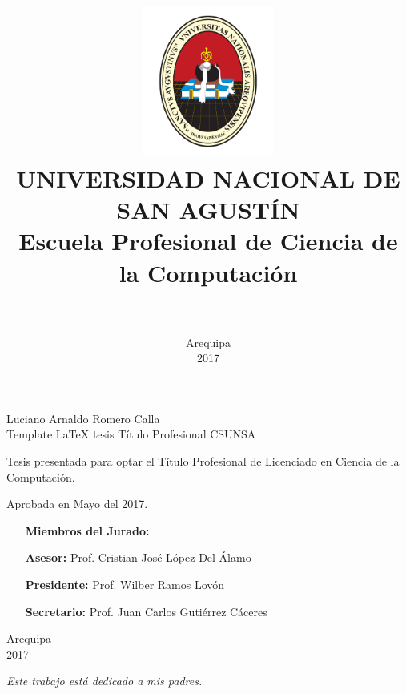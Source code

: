\documentclass[11pt,a4paper]{report}
\title
{
	\includegraphics[width=0.32\textwidth]{figures/unsa}\\\vspace{1cm}
	\large UNIVERSIDAD NACIONAL DE SAN AGUSTÍN\\ 
	Escuela Profesional de Ciencia de la Computación\\\vspace{3cm}
	\Large\bf\mytitle\\\vspace{2cm}
}
\author{\Large\sc\myauthor}
\date{\vspace{3cm}\sc Arequipa\\2017}
\theoremstyle{custom}
\numberwithin{mydef}{chapter}
\def\myauthor{Luciano Arnaldo Romero Calla}
\def\mytitle{Template LaTeX tesis Título Profesional CSUNSA}
\begin{document}
\maketitle

\begin{titlepage}
\begin{center}
{\Large\sc\myauthor}\\\vspace{2cm}
{\Large\mytitle}\\\vspace{3cm}
\end{center}
\null\hfill
\begin{minipage}{0.48\textwidth}
\large
Tesis presentada para optar el Título Profesional de
Licenciado en Ciencia de la Computación.
\end{minipage}

\bigskip\vspace{2cm}
\large Aprobada en Mayo del 2017.\\\vspace{2cm}

\null\hfill
\begin{minipage}{0.52\textwidth}
\large
\begin{itemize}
\item[] \textbf{Miembros del Jurado:}
\item[\bf Asesor:] Prof. Cristian José López Del Álamo
\item[\bf Presidente:] Prof. Wilber Ramos Lovón
\item[\bf Secretario:] Prof. Juan Carlos Gutiérrez Cáceres
\end{itemize}
\end{minipage}

\bigskip\vspace{4cm}
\begin{center}
\large\sc Arequipa\\2017
\end{center}
\end{titlepage}

\begin{titlepage}
\null\vfill\null\hfill\em Este trabajo está dedicado a mis padres.
\end{titlepage}

\setlength{\parskip}{1em}

%

\setlength{\parskip}{0em}
\tableofcontents
\listoffigures
\listoftables

\setlength{\parskip}{1em}

\end{document}
